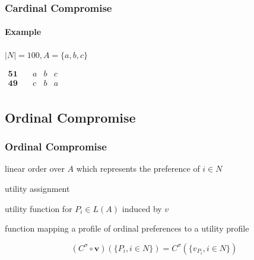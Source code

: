 \documentclass{beamer}
\newcommand{\R}{\mathbb{R}}
\newcommand{\vpr}{\mathbf{v}}
\begin{document}
\begin{frame}
	\frametitle{Cardinal Compromise}
	\framesubtitle{Example}
	$|N|=100, A=\{a,b,c\}$
	\begin{center}
		$
		\begin{array}{cccc}
		\mathbf{51} \quad &a&b&c\\
		\mathbf{49} \quad &c&b&a\\
		\end{array}
		$
	\end{center}
\end{frame}

\subsection{Ordinal Compromise}
\begin{frame}
	\frametitle{Ordinal Compromise}
	\begin{description}
		\item[$P_i \in L(A)$] linear order over $A$ which represents the preference of $i\in N$
		\item[$v:\left\{ 1,..., m\right\} \rightarrow \R$] utility assignment
		\item[$v_{P_{i}} \in \R^A $] utility function for $P_{i}\in L(A)$ induced by $v$
		\item[$\mathbf{v}: L(A)^N \rightarrow \mathcal{U}$] function mapping a profile of ordinal preferences to a utility profile 
	\end{description}
	 \begin{block}{}
		\[(C^{\sigma }\circ \vpr)(\{P_i, i \in N\}) = C^{\sigma}(\{v_{P_i}, i \in N\})\]
	\end{block}
\end{frame}
\end{document}
